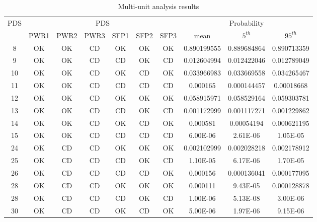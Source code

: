 \begin{table}
  \centering
  \begin{tabular}{c|cccccc|ccc}
    \hline
    PDS & \multicolumn{6}{c}{PDS} & \multicolumn{3}{c}{Probability}   \\
    \cline{2-10}
         & PWR1 & PWR2 & PWR3 & SFP1 & SFP2 & SFP3 & mean & $5^{th}$ & $95^{th}$     \\
    \hline \hline
     8    & OK   & OK   & CD   & OK   & OK   & OK   & 0.890199555 & 0.889684864 & 0.890713359 \\
     9    & OK   & OK   & CD   & CD   & OK   & CD   & 0.012604994 & 0.012422046 & 0.012789049 \\
     10   & OK   & OK   & CD   & OK   & CD   & OK   & 0.033966983 & 0.033669558 & 0.034265467 \\
     11   & OK   & OK   & CD   & CD   & CD   & CD   & 0.000165    & 0.000144457 & 0.00018668  \\
     12   & OK   & OK   & CD   & OK   & OK   & OK   & 0.058915971 & 0.058529164 & 0.059303781 \\
     13   & OK   & OK   & CD   & CD   & OK   & CD   & 0.001172999 & 0.001117271 & 0.001229862 \\
     14   & OK   & OK   & CD   & OK   & CD   & OK   & 0.000581    & 0.00054194  & 0.000621195 \\
     15   & OK   & OK   & CD   & CD   & CD   & CD   & 6.00E-06    & 2.61E-06    & 1.05E-05    \\
     24   & OK   & CD   & CD   & OK   & OK   & OK   & 0.002102999 & 0.002028218 & 0.002178912 \\
     25   & OK   & CD   & CD   & CD   & OK   & CD   & 1.10E-05    & 6.17E-06    & 1.70E-05    \\
     26   & OK   & CD   & CD   & CD   & CD   & OK   & 0.000156    & 0.000136041 & 0.000177095 \\
     28   & OK   & CD   & CD   & OK   & OK   & OK   & 0.000111    & 9.43E-05    & 0.000128878 \\
     28   & OK   & CD   & CD   & CD   & OK   & CD   & 1.00E-06    & 5.13E-08    & 3.00E-06    \\
     30   & OK   & CD   & CD   & OK   & CD   & OK   & 5.00E-06    & 1.97E-06    & 9.15E-06    \\
    \hline
  \end{tabular}
  \caption{Multi-unit analysis results}
  \label{tab:resultsMain}
\end{table}


